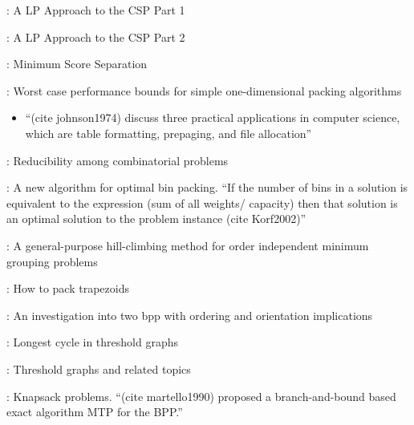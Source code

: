 \documentclass[oribibl]{llncs}
\begin{document}
\cite{gilmore1961}: A LP Approach to the CSP Part 1

\cite{gilmore1963}: A LP Approach to the CSP Part 2

\cite{goulimis2004}: Minimum Score Separation

\cite{johnson1974}: Worst case performance bounds for simple one-dimensional packing algorithms
\begin{itemize}
	\item ``(cite johnson1974) discuss three practical applications in computer science, which are table formatting, prepaging, and file allocation''
\end{itemize}

\cite{karp1972}: Reducibility among combinatorial problems

\cite{korf2002}: A new algorithm for optimal bin packing. ``If the number of bins in a solution is equivalent to the expression (sum of all weights/ capacity) then that solution is an optimal solution to the problem instance (cite Korf2002)'' 

\cite{lewis2009}: A general-purpose hill-climbing method for order independent minimum grouping problems

\cite{lewis2017}: How to pack trapezoids

\cite{lewis2011}: An investigation into two bpp with ordering and orientation implications

\cite{mahadev1994}: Longest cycle in threshold graphs

\cite{mahadev1995}: Threshold graphs and related topics

\cite{martello1990b}: Knapsack problems. ``(cite martello1990) proposed a branch-and-bound based exact algorithm MTP for the BPP.'' 









%


\begin{comment}
- all citations have been changed to \cite{}, so that the citation shows up in green in latex. some of these citations need to be changed to (\citealp{}) (or \citep{}, same outcome) as the citations need to be in brackets but without the year in brackets.
- 1. "As proven by \cite{dosa2007}, ..." -> "As proven by Dosa (2007), ..."
- 2. "... FFD algorithm (\cite{eilon1971}), which ..." -> "... FFD algorithm (Eilon and Christofides (1971)), which .." NOTE THE YEAR IS IN BRACKETS INSIDE THE CITATION BRACKETS, THIS IS ONLY WHILE WRITING, THIS NEEDS TO BE CHANGED BEFORE SUBMISSION
- 3. "... FFD algorithm (\citealp{eilon1971}), which ..." -> "... FFD algorithm (Eilon and Christofides, 1971), which .." THIS IS HOW IT NEEDS TO BE WHEN SUBMITTING
\end{comment}
\end{document}
